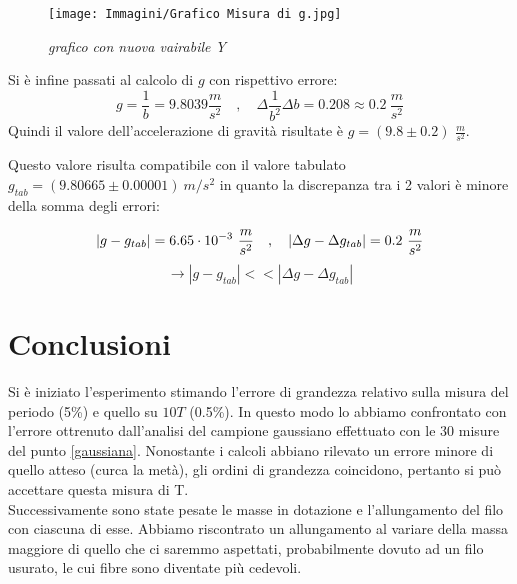 \documentclass[12pt, a4paper]{article}
\begin{document}
\begin{figure}[h!]
    \centering
    \texttt{[image: Immagini/Grafico Misura di g.jpg]}
    \caption{\textit{{\footnotesize{grafico con nuova vairabile Y}}}}
    \label{IndipendenzaTM}
\end{figure}


\newpage
Si è infine passati al calcolo di $g$ con rispettivo errore:
\begin{equation*}
    g=\frac{1}{b}=9.8039\frac{m}{s^2} \quad , \quad     \Delta \frac{1}{b^2}\Delta b=0.208\approx 0.2\ \frac{m}{s^2}
\end{equation*}
Quindi il valore dell'accelerazione di gravità risultate è $g=(9.8\pm0.2)$ $\frac{m}{s^2}$.

\addvspace{1cm}
Questo valore risulta compatibile con il valore tabulato $g_{tab}=(9.80665\pm 0.00001)\ m/s^2$ in quanto la discrepanza tra i 2 valori è minore della somma degli errori:

\begin{equation*}
    |g-g_{tab}|=6.65\cdot 10^{-3} \ \frac{m}{s^2}  \quad , \quad  |\Delta g-\Delta g_{tab}|=0.2\ \frac{m}{s^2}\\
\end{equation*}
\begin{equation*}
    \xrightarrow{} |g-g_{tab}|<< |\Delta g-\Delta g_{tab}|
\end{equation*}








\newpage
\section{Conclusioni}
Si è iniziato l'esperimento stimando l'errore di grandezza relativo sulla misura del periodo (5\%) e quello su $10T$ (0.5\%). In questo modo lo abbiamo confrontato con l'errore ottrenuto dall'analisi del campione gaussiano effettuato con le 30 misure del punto \ref{gaussiana}.
Nonostante i calcoli abbiano rilevato un errore minore di quello atteso (curca la metà), gli ordini di grandezza coincidono, pertanto si può accettare questa misura di T.\\

Successivamente sono state pesate le masse in dotazione e l'allungamento del filo con ciascuna di esse. 
Abbiamo riscontrato un allungamento al variare della massa maggiore di quello che ci saremmo aspettati, probabilmente dovuto ad un filo usurato, le cui fibre sono diventate più cedevoli. 
\end{document}
